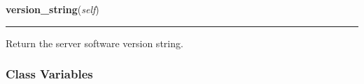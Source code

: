     \vspace{0.5ex}

    \begin{boxedminipage}{\textwidth}

    \raggedright \textbf{version\_string}(\textit{self})

    \vspace{-1.5ex}

    \rule{\textwidth}{0.5\fboxrule}
    Return the server software version string.

    \vspace{1ex}

    \end{boxedminipage}



  \subsubsection{Class Variables}

